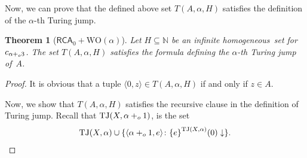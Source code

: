 \documentclass[11pt]{amsart}
\newtheorem{theorem}[thm]{Theorem}
\theoremstyle{definition}
\theoremstyle{remark}
\theoremstyle{plain}
\def\la{\langle}
\def\ra{\rangle}
\newcommand{\numberset}{\mathbb}
\newcommand{\N}{\numberset{N}}
\def\a{\alpha}
\newcommand{\RCA}{\mathsf{RCA}_0}
\newcommand{\TJ}{\mathsf{TJ}}
\def\TJ{{\textrm{TJ}}}
\newcommand{\set}[1]{{\{{#1}\}}}
\def\WO{{\textrm{WO}}}
\newcommand{\pluso}{+\sb{o}}
\def\N{{\mathbb{N}}}
\newcommand{\homo}{homogeneous}
\newcommand{\lorenzo}[1]{\textcolor{blue}{#1}}
\newcommand{\andrea}[1]{\textcolor{green}{#1}}
\begin{document}
Now, we can prove that the defined above set $T(A,\alpha,H)$ satisfies the definition of the $\alpha$-th Turing jump.


\begin{theorem}[$\RCA+\WO(\a)$]\label{thm:jump:from:homo}
Let $H\subseteq\N$ be an infinite \homo\ set for $c\sb{\alpha\pluso3}$. 
The set $T(A,\alpha,H)$ satisfies the formula defining the $\alpha$-th Turing jump of~$A$.
\end{theorem}

\begin{proof}
It is obvious that a tuple $\la 0,z \ra \in T(A,\alpha,H)$ if and only if $z\in A$.

Now, we show that $T(A,\alpha,H)$ satisfies the recursive clause in the definition of Turing jump.
Recall that $\TJ(X,\alpha\pluso1)$, is the set 
$$\TJ(X,\alpha) \cup \set{\la \alpha \pluso 1, e \ra \colon \set{e}^{\TJ(X, \alpha)}(0)\downarrow }.$$


\end{proof}
\end{document}
